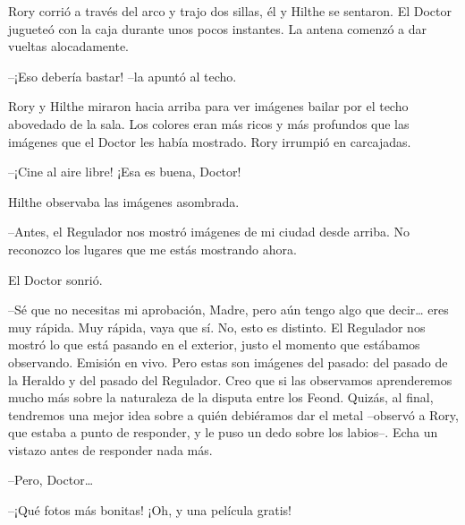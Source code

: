 {Rory corrió a través del arco y trajo dos sillas, él y Hilthe se
	sentaron. El Doctor jugueteó con la caja durante unos pocos instantes.
La antena comenzó a dar vueltas alocadamente.}

{--¡Eso debería bastar! --la apuntó al techo.}

{Rory y Hilthe miraron hacia arriba para ver imágenes bailar por el
	techo abovedado de la sala. Los colores eran más ricos y más profundos
	que las imágenes que el Doctor les había mostrado. Rory irrumpió en
carcajadas.}

{--¡Cine al aire libre! ¡Esa es buena, Doctor!}

{Hilthe observaba las imágenes asombrada.}

{--Antes, el Regulador nos mostró imágenes de mi ciudad desde arriba.
No reconozco los lugares que me estás mostrando ahora.}

{El Doctor sonrió.}

{--Sé que no necesitas mi aprobación, Madre, pero aún tengo algo que
	decir\ldots{} eres muy rápida. Muy rápida, vaya que sí. No, esto es
	distinto. El Regulador nos mostró lo que está pasando en el exterior,
	justo el momento que estábamos observando. Emisión en vivo. Pero estas
	son imágenes del pasado: del pasado de la Heraldo y del pasado del
	Regulador. Creo que si las observamos aprenderemos mucho más sobre la
	naturaleza de la disputa entre los Feond. Quizás, al final, tendremos
	una mejor idea sobre a quién debiéramos dar el metal --observó a Rory,
	que estaba a punto de responder, y le puso un dedo sobre los labios--.
Echa un vistazo antes de responder nada más.}

{--Pero, Doctor\ldots{}}

{--¡Qué fotos más bonitas! ¡Oh, y una película gratis!}

